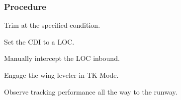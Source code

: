 % 
% 
%
 \subsubsection*{Procedure}
 \begin{compactenum}
    \item Trim at the specified condition.
    \item Set the CDI to a LOC.
    \item Manually intercept the LOC inbound.
    \item Engage the wing leveler in TK Mode.
    \item Observe tracking performance all the way to the runway.
    \end{compactenum}
